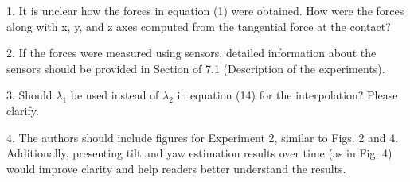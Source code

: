 \begin{revquote}
1. It is unclear how the forces in equation (1) were obtained. How were the forces along with x, y, and z axes computed from the tangential force at the contact?
\end{revquote}

\begin{revquote}
2. If the forces were measured using sensors, detailed information about the sensors should be provided in Section of 7.1 (Description of the experiments).
\end{revquote}

\begin{revquote}
3. Should $\lambda_1$ be used instead of $\lambda_2$ in equation (14) for the interpolation? Please clarify.
\end{revquote}

\begin{revquote}
4. The authors should include figures for Experiment 2, similar to Figs. 2 and 4. Additionally, presenting tilt and yaw estimation results over time (as in Fig. 4) would improve clarity and help readers better understand the results.
\end{revquote}